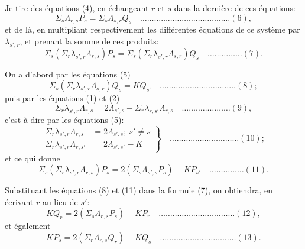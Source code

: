 \documentclass[11pt,a4paper]{book}
\begin{document}
Je tire des \'equations (4), en \'echangeant $r$ et $s$ dans la derni\`ere de ces \'equations:
\[
\Sigma_s \Lambda_{r,s} P_s = \Sigma_s \Lambda_{s,r} Q_s \quad \ldots \ldots \ldots \ldots \ldots \ldots \ldots \ldots \ldots \ldots \ldots \ldots \ldots (6),
\]
et de l\`a, en multipliant respectivement les diff\'erentes \'equations de ce syst\`eme par $\lambda_{s',r}$, et prenant la somme de ces produits:
\[
\Sigma_s (\Sigma_r \lambda_{s',r} \Lambda_{r,s}) P_s = \Sigma_s (\Sigma_r \lambda_{s',r} \Lambda_{s,r}) Q_s \quad \ldots \ldots \ldots \ldots \ldots (7).
\]

On a d'abord par les \'equations (5)
\[
\Sigma_s (\Sigma_r \lambda_{s',r} \Lambda_{s,r}) Q_s = K Q_{s'} \quad \ldots \ldots \ldots \ldots \ldots \ldots \ldots \ldots \ldots \ldots \ldots (8);
\]
puis par les \'equations (1) et (2)
\[
\Sigma_r \lambda_{s',r} \Lambda_{r,s} = 2\Lambda_{s',s} - \Sigma_r \lambda_{r,s'} \Lambda_{r,s} \quad \ldots \ldots \ldots \ldots \ldots \ldots \ldots (9),
\]
c'est-\`a-dire par les \'equations (5):
\[
\left. \begin{aligned}
\Sigma_r \lambda_{s',r} \Lambda_{r,s} &= 2\Lambda_{s',s};\ s' \neq s \\
\Sigma_r \lambda_{s',r} \Lambda_{r,s'} &= 2\Lambda_{s',s'} - K
\end{aligned} \right\} \quad \ldots \ldots \ldots \ldots \ldots \ldots \ldots \ldots \ldots \ldots (10);
\]
et ce qui donne
\[
\Sigma_s (\Sigma_r \lambda_{s',r} \Lambda_{r,s}) P_s = 2(\Sigma_s \Lambda_{s',s} P_s) - K P_{s'} \quad \ldots \ldots \ldots \ldots \ldots (11).
\]

Substituant les \'equations (8) et (11) dans la formule (7), on obtiendra, en \'ecrivant $r$ au lieu de $s'$:
\[
K Q_r = 2(\Sigma_s \Lambda_{r,s} P_s) - K P_r \quad \ldots \ldots \ldots \ldots \ldots \ldots \ldots \ldots \ldots \ldots \ldots (12),
\]
et \'egalement
\[
K P_s = 2(\Sigma_r \Lambda_{r,s} Q_r) - K Q_s \quad \ldots \ldots \ldots \ldots \ldots \ldots \ldots \ldots \ldots \ldots \ldots (13).
\]
\end{document}
